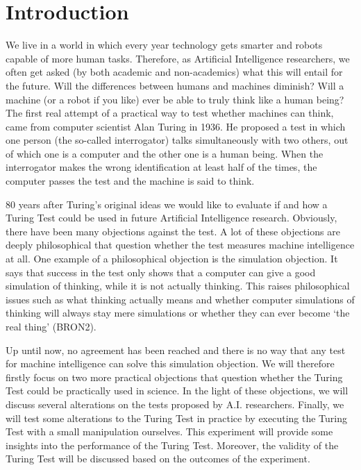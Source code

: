 \section{Introduction}
We live in a world in which every year technology gets smarter and robots capable of more human tasks. Therefore, as Artificial Intelligence researchers, we often get asked (by both academic and non-academics) what this will entail for the future. Will the differences between humans and machines diminish? Will a machine (or a robot if you like) ever be able to truly think like a human being? The first real attempt of a practical way to test whether machines can think, came from computer scientist Alan Turing in 1936. He proposed a test in which one person (the so-called interrogator) talks simultaneously with two others, out of which one is a computer and the other one is a human being. When the interrogator makes the wrong identification at least half of the times, the computer passes the test and the machine is said to think.

     80 years after Turing’s original ideas we would like to evaluate if and how a Turing Test could be used in future Artificial Intelligence research. Obviously, there have been many objections against the test. A lot of these objections are deeply philosophical that question whether the test measures machine intelligence at all. One example of a philosophical objection is the simulation objection. It says that success in the test only shows that a computer can give a good simulation of thinking, while it is not actually thinking. This raises philosophical issues such as what thinking actually means and whether computer simulations of thinking will always stay mere simulations or whether they can ever become ‘the real thing’ (BRON2).

     Up until now, no agreement has been reached and there is no way that any test for machine intelligence can solve this simulation objection. We will therefore firstly focus on two more practical objections that question whether the Turing Test could be practically used in science. In the light of these objections, we will discuss several alterations on the tests proposed by A.I. researchers. Finally, we will test some alterations to the Turing Test in practice by executing the Turing Test with a small manipulation ourselves. This experiment will provide some insights into the performance of the Turing Test. Moreover, the validity of the Turing Test will be discussed based on the outcomes of the experiment.

